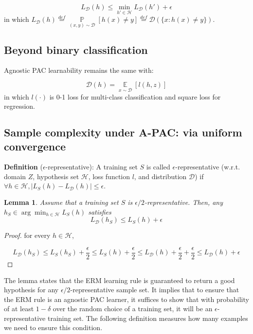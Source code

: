\documentclass{article}
\newtheorem{lemma}{Lemma}
\newtheorem*{proof}{Proof}
\begin{document}
	\begin{equation*}
	L_\mathcal{D}(h)\leq\min\limits_{h'\in\mathcal{H}}L_\mathcal{D}(h')+\epsilon
	\end{equation*}
in which $L_\mathcal{D}(h)\overset{def}{=}\mathop{\mathbb{P}}\limits_{(x,y)\sim\mathcal{D}}[h(x)\neq y]\overset{def}{=}\mathcal{D}(\{x:h(x)\neq y\})$.

	\subsection{Beyond binary classification}

	Agnostic PAC learnability remains the same with:
	
	\begin{equation}
	\mathcal{D}(h)=\mathop{\mathbb{E}}\limits_{x\sim\mathcal{D}}[l(h,z)]
	\end{equation}
in which $l(\cdot)$ is 0-1 loss for multi-class classification and square loss for regression. 

	\subsection{Sample complexity under A-PAC: via uniform convergence}
	
	\textbf{Definition} ($\epsilon$-representative): A training set $S$ is called $\epsilon$-representative (w.r.t. domain $Z$, hypothesis set $\mathcal{H}$, loss function $l$, and distribution $\mathcal{D}$) if $\forall h\in\mathcal{H},|L_S(h)-L_\mathcal{D}(h)|\leq\epsilon$.
	
	\begin{lemma}
	Assume that a training set $S$ is $\epsilon/2$-representative. Then, any $h_S\in\arg\min_{h\in\mathcal{H}}L_S(h)$ satisfies
	\begin{equation}
	L_\mathcal{D}(h_S) \leq L_S(h)+\epsilon
	\end{equation}
	\end{lemma}
	
	\begin{proof}
	for every $h\in\mathcal{H}$,
	
	\begin{equation*}
	L_\mathcal{D}(h_S) \leq L_S(h_S)+\frac{\epsilon}{2}
	\leq L_S(h)+\frac{\epsilon}{2} \leq L_\mathcal{D}(h)+\frac{\epsilon}{2}+\frac{\epsilon}{2}
	\leq L_\mathcal{D}(h)+\epsilon
	\end{equation*}	 
	\end{proof}
	
	The lemma states that the ERM learning rule is guaranteed to return a good hypothesis for any $\epsilon/2$-representative sample set. It implies that to ensure that the ERM rule is an agnostic PAC learner, it suffices to show that with probability of at least $1-\delta$ over the random choice of a training set, it will be an $\epsilon$-representative training set. The following definition measures how many examples we need to ensure this condition.
	
\end{document}
